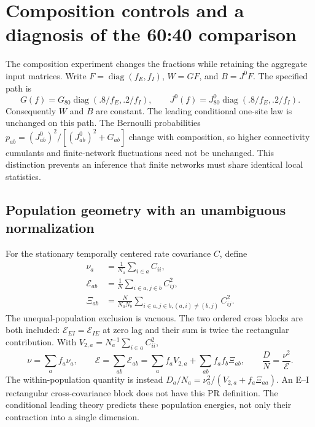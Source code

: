 \section{Composition controls and a diagnosis of the 60:40 comparison}
\label{sec:composition-diagnosis-next}
The composition experiment changes the fractions while retaining the
aggregate input matrices. Write $F=\operatorname{diag}(f_E,f_I)$,
$W=GF$, and $B=J^0F$. The specified path is
\begin{equation}
 G(f)=G_{80}\operatorname{diag}(.8/f_E,.2/f_I),\qquad
 J^0(f)=J^0_{80}\operatorname{diag}(.8/f_E,.2/f_I).
\end{equation}
Consequently $W$ and $B$ are constant. The leading conditional one-site law
is unchanged on this path. The Bernoulli probabilities
$p_{ab}=(J^0_{ab})^2/[(J^0_{ab})^2+G_{ab}]$ change with composition,
so higher connectivity cumulants and finite-network fluctuations need not
be unchanged. This distinction prevents an inference that finite networks
must share identical local statistics.

\subsection{Population geometry with an unambiguous normalization}
For the stationary temporally centered rate covariance $C$, define
\begin{align}
 \nu_a&=\frac1{N_a}\sum_{i\in a}C_{ii},\\
 \mathcal E_{ab}&=\frac1N\sum_{i\in a,j\in b}C_{ij}^2,\\
 \Xi_{ab}&=\frac{N}{N_aN_b}\sum_{i\in a,j\in b,
                    (a,i)\ne(b,j)}C_{ij}^2.
\end{align}
The unequal-population exclusion is vacuous. The two ordered cross blocks
are both included: $\mathcal E_{EI}=\mathcal E_{IE}$ at zero lag and their
sum is twice the rectangular contribution. With
$V_{2,a}=N_a^{-1}\sum_{i\in a}C_{ii}^2$,
\begin{equation}
 \nu=\sum_af_a\nu_a,\qquad
 \mathcal E=\sum_{ab}\mathcal E_{ab}
 =\sum_af_a V_{2,a}+\sum_{ab}f_af_b\Xi_{ab},\qquad
 \frac DN=\frac{\nu^2}{\mathcal E}.
\end{equation}
The within-population quantity is instead
$D_a/N_a=\nu_a^2/(V_{2,a}+f_a\Xi_{aa})$.
An E--I rectangular cross-covariance block does not have this PR definition.
The conditional leading theory predicts these population energies, not only
their contraction into a single dimension.

